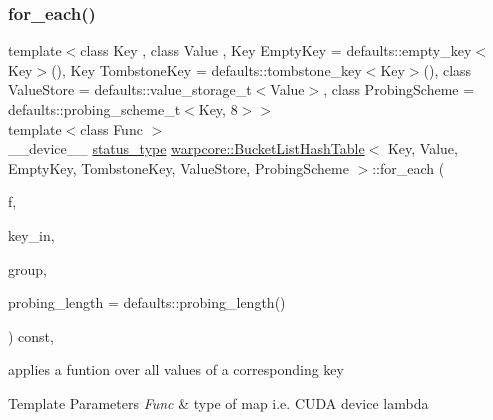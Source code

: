 \subsubsection{\texorpdfstring{for\+\_\+each()}{for\_each()}}
{\footnotesize\ttfamily template$<$class Key , class Value , Key Empty\+Key = defaults\+::empty\+\_\+key$<$\+Key$>$(), Key Tombstone\+Key = defaults\+::tombstone\+\_\+key$<$\+Key$>$(), class Value\+Store  = defaults\+::value\+\_\+storage\+\_\+t$<$\+Value$>$, class Probing\+Scheme  = defaults\+::probing\+\_\+scheme\+\_\+t$<$\+Key, 8$>$$>$ \\
template$<$class Func $>$ \\
\+\_\+\+\_\+device\+\_\+\+\_\+ \hyperlink{classwarpcore_1_1Status}{status\+\_\+type} \hyperlink{classwarpcore_1_1BucketListHashTable}{warpcore\+::\+Bucket\+List\+Hash\+Table}$<$ Key, Value, Empty\+Key, Tombstone\+Key, Value\+Store, Probing\+Scheme $>$\+::for\+\_\+each (\begin{DoxyParamCaption}\item[{Func}]{f,  }\item[{const key\+\_\+type}]{key\+\_\+in,  }\item[{const cg\+::thread\+\_\+block\+\_\+tile$<$ \hyperlink{classwarpcore_1_1BucketListHashTable_a3807ac1b39b47617d862c5dd17f21330}{cg\+\_\+size}()$>$ \&}]{group,  }\item[{const index\+\_\+type}]{probing\+\_\+length = {\ttfamily defaults\+:\+:probing\+\_\+length()} }\end{DoxyParamCaption}) const\hspace{0.3cm}{\ttfamily [inline]}, {\ttfamily [noexcept]}}



applies a funtion over all values of a corresponding key 


\begin{DoxyTemplParams}{Template Parameters}
{\em Func} & type of map i.\+e. C\+U\+DA device lambda \\
\hline
\end{DoxyTemplParams}

